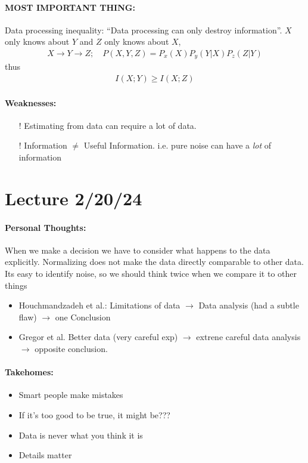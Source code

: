\documentclass[../main.tex]{subfiles}
\begin{document}
\paragraph*{MOST IMPORTANT THING:} Data processing inequality: ``Data processing can only destroy
information''. $X$ only knows about $Y$ and $Z$ only knows about $X$,
\begin{align*}
    X \to Y \to Z; \quad P(X,Y,Z) = P_x(X) P_y(Y|X) P_z(Z|Y)
\end{align*}
thus
\begin{align*}
    I(X;Y) \geq I(X;Z)
\end{align*}
\paragraph*{Weaknesses:}
\begin{itemize}
    \item[!] Estimating from data can require a lot of data.
    \item[!] Information $\neq$ Useful Information. i.e. pure noise can have a \emph{lot} of
    information
\end{itemize}

\newpage 
\section*{Lecture 2/20/24}
\barh \vspace{10px}

\paragraph*{Personal Thoughts:} When we make a decision we have to consider what happens to the
data explicitly. Normalizing does not make the data directly comparable to other data. Its easy to
identify noise, so we should think twice when we compare it to other things

\begin{itemize}
    \item Houchmandzadeh et al.: 
    Limitations of data $\to$ Data analysis (had a subtle flaw) $\to$ one Conclusion
    \item Gregor et al.
    Better data (very careful exp) $\to$ extrene careful data analysis $\to$ opposite conclusion.
\end{itemize}
\paragraph*{Takehomes:} 
\begin{itemize}
    \item Smart people make mistakes
    \item If it's too good to be true, it might be???
    \item Data is never what you think it is
    \item Details matter
\end{itemize}
\end{document}
